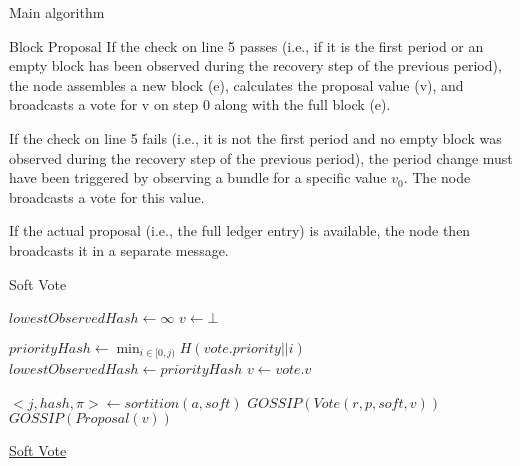 \documentclass[10pt,a4paper]{article}
\begin{document}
\begin{section}{Main algorithm}
\begin{subsection}{Block Proposal}
If the check on line 5 passes (i.e., if it is the first period or an empty block
 has been observed during the recovery step of the previous period), 
 the node assembles a new block (e), calculates the proposal value (v), 
 and broadcasts a vote for v on step 0 along with the full block (e).

If the check on line 5 fails (i.e., it is not the first period and no 
empty block was observed during the recovery step of the previous period), 
the period change must have been triggered by observing a bundle for a specific value $v_0$. 
The node broadcasts a vote for this value.

If the actual proposal (i.e., the full ledger entry) is available, the node then broadcasts it 
in a separate message.


\end{subsection}
\begin{subsection}{Soft Vote}\label{ssect:softvote}

\begin{algorithm}[H]
    \begin{algorithmic}[1]
    \State $lowestObservedHash \gets \infty$
    \State $v \gets \bot$ 


        \State $priorityHash \gets \min_{i \in [0, j)} H(vote.priority || i)$
            \State $lowestObservedHash \gets priorityHash$
            \State $v \gets vote.v$
        \EndIf    
    \EndFor

        \State $<j, hash, \pi> \gets sortition(a, soft)$
            \State $GOSSIP(Vote(r, p, soft, v))$
                \State $GOSSIP(Proposal(v))$
            \EndIf
        \EndIf
    \EndFor

    \EndFunction
    \end{algorithmic}
    \caption{\underline{Soft Vote}}
\end{algorithm}



\end{subsection}
\end{section}
\end{document}

